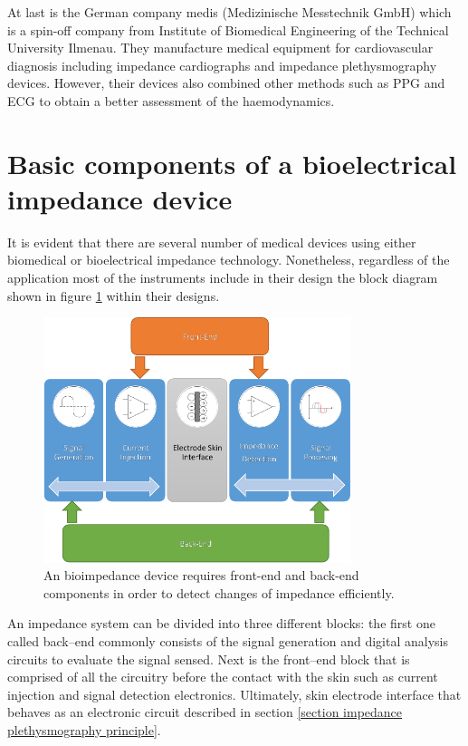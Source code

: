 At last is the German company medis (Medizinische Messtechnik GmbH) which is a spin-off company from Institute of Biomedical Engineering of the Technical University Ilmenau. They manufacture medical equipment for cardiovascular diagnosis including impedance cardiographs and impedance plethysmography devices. However, their devices also combined other methods such as PPG and ECG to obtain a better assessment of the haemodynamics. 

\section{Basic components of a bioelectrical impedance device}
\label{section impedance basic}
It is evident that there are several number of medical devices using either biomedical or bioelectrical impedance technology. Nonetheless, regardless of the application most of the instruments include in their design the block diagram shown in figure \ref{fig:block diagram bioimpedance} within their designs. 

\begin{figure}[!htpb]
	\centering
	\includegraphics[width=9cm,keepaspectratio]{figure11}    
	\caption[Block diagram of a common bioimpedance device]{An bioimpedance device requires front-end and back-end components in order to detect changes of impedance efficiently.}
	\label{fig:block diagram bioimpedance}
\end{figure}

An impedance system can be divided into three different blocks: the first one called back–end commonly consists of the signal generation and digital analysis circuits to evaluate the signal sensed. Next is the front–end block that is comprised of all the circuitry before the contact with the skin such as current injection and signal detection electronics. Ultimately, skin electrode interface that behaves as an electronic circuit described in section \ref{section impedance plethysmography principle}. 

